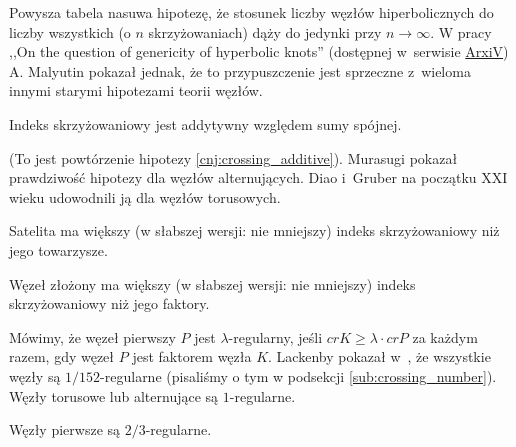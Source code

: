 Powysza tabela nasuwa hipotezę,
że stosunek liczby węzłów hiperbolicznych do liczby wszystkich
(o $n$ skrzyżowaniach) dąży do jedynki przy $n \to \infty$.
W pracy ,,On the question of genericity of hyperbolic knots'' (dostępnej w~serwisie \href{https://arxiv.org/abs/1612.03368v1}{ArxiV}) A. Malyutin pokazał jednak, że to przypuszczenie jest sprzeczne z~wieloma innymi starymi hipotezami teorii węzłów.

\begin{conjecture}
    Indeks skrzyżowaniowy jest addytywny względem sumy spójnej.
\end{conjecture}

(To jest powtórzenie hipotezy \ref{cnj:crossing_additive}).
Murasugi pokazał prawdziwość hipotezy dla węzłów alternujących.
Diao i~Gruber na początku XXI wieku udowodnili ją dla węzłów torusowych.

\begin{conjecture}
    Satelita ma większy
    (w słabszej wersji: nie mniejszy)
    indeks skrzyżowaniowy niż jego towarzysze.
\end{conjecture}

\begin{conjecture}
    Węzeł złożony ma większy
    (w słabszej wersji: nie mniejszy)
    indeks skrzyżowaniowy niż jego faktory.
\end{conjecture}

Mówimy, że węzeł pierwszy $P$ jest $\lambda$-regularny,
jeśli $cr K \ge \lambda \cdot cr P$ za każdym razem,
gdy węzeł $P$ jest faktorem węzła $K$.
Lackenby pokazał w~\cite{lackenby09}, że wszystkie węzły są $1/152$-regularne (pisaliśmy o tym w podsekcji \ref{sub:crossing_number}).
Węzły torusowe lub alternujące są $1$-regularne.

\begin{conjecture}
    Węzły pierwsze są $2/3$-regularne.
\end{conjecture}




